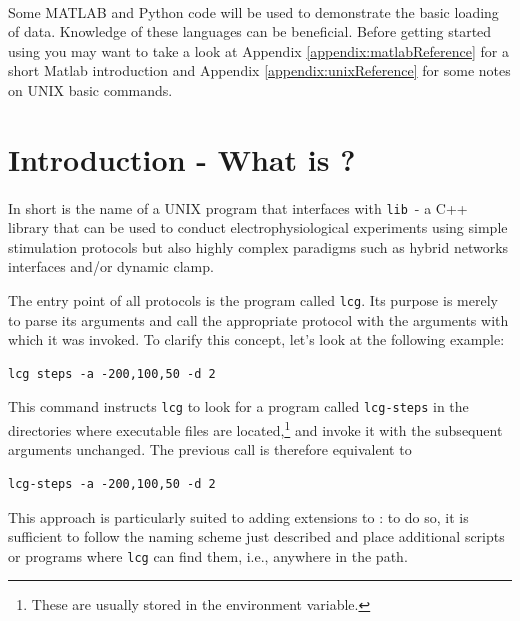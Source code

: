 \paragraph{}
Some MATLAB and Python code will be used to demonstrate the basic
loading of data. Knowledge of these languages can be beneficial.
Before getting started using \texttt{\progname} you may want to take a
look at Appendix \ref{appendix:matlabReference} for a short Matlab
introduction and Appendix \ref{appendix:unixReference} for some notes
on UNIX basic commands.

\section{Introduction - What is \progname?}

\paragraph{}
In short \textbf{\progname} is the name of a UNIX program that interfaces with \texttt{lib\progname}\  - a C++ library that can be used to conduct electrophysiological experiments using simple stimulation protocols but also highly complex paradigms such as hybrid networks interfaces and/or dynamic clamp. 


\iffalse

The entry point of all \progname protocols is the program called
\verb+lcg+. Its purpose is merely to parse its arguments and
call the appropriate protocol with the arguments with which it was
invoked. To clarify this concept, let's look at the following example:
\begin{lstlisting}
lcg steps -a -200,100,50 -d 2
\end{lstlisting}
This command instructs \verb+lcg+ to look for a program called
\verb+lcg-steps+ in the directories where executable files are
located,\footnote{These are usually stored in the 
environment variable.} and invoke it with the subsequent arguments
unchanged. The previous call is therefore equivalent to
\begin{lstlisting}
lcg-steps -a -200,100,50 -d 2
\end{lstlisting}
This approach is particularly suited to adding extensions to
\progname: to do so, it is sufficient to follow the naming scheme just
described and place additional scripts or programs where
\verb+lcg+ can find them, i.e., anywhere in the path.
 

